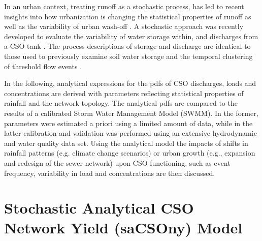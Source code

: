 \documentclass[draft,linenumbers]{agujournal2018}
\begin{document}
In an urban context, treating runof\/f as a stochastic process,  has led to recent insights into how urbanization is changing the statistical properties of runof\/f as well as the variability of urban wash-of\/f \citep{Mej_a_2014,Daly_2014}. A  stochastic approach was recently developed to evaluate the variability of water storage within, and discharges from a CSO tank \citep{Wang_2018}. The process descriptions of storage and discharge are identical to those used to previously examine soil water storage \citep{Milly_1993,McGrath_2007} and the temporal clustering of threshold f\/low events \citep{Laio_2001,McGrath_2007,Aquino_2017}. 

In the following, analytical expressions for the pdfs of CSO discharges, loads and concentrations are derived with parameters ref\/lecting statistical properties of rainfall and the network topology. The analytical pdfs are compared to the results of a calibrated Storm Water Management Model (SWMM). In the former, parameters were estimated a priori using a limited amount of data, while in the latter calibration and validation was performed using an extensive hydrodynamic and water quality data set. Using the analytical model the impacts of shifts in rainfall patterns (e.g. climate change scenarios) or urban growth (e.g., expansion and redesign of the sewer network) upon CSO functioning, such as event frequency, variability in load and concentrations are then discussed.


 
\section{Stochastic Analytical CSO Network Yield (saCSOny) Model}
\end{document}
